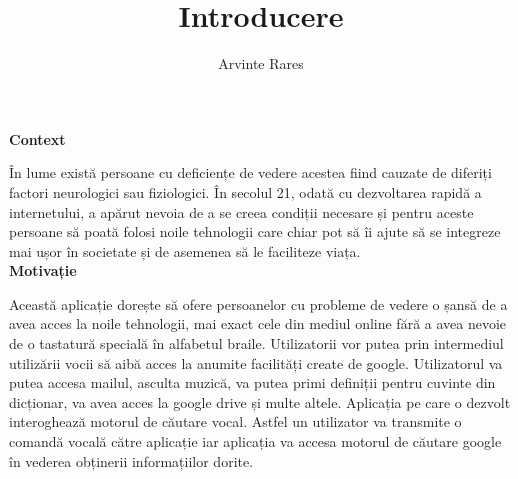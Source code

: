 \documentclass[a4paper]{article}
\title{Introducere}
\author{Arvinte Rares}
\date{}
\begin{document}
\maketitle


\large
\textbf{Context}\\
\normalsize

În lume există persoane cu deficiențe de vedere acestea fiind cauzate de diferiți factori neurologici sau fiziologici. În secolul 21, odată cu dezvoltarea rapidă a internetului, a apărut nevoia de a se creea condiții necesare și pentru aceste persoane să poată folosi noile tehnologii care chiar pot să îi ajute să se integreze mai ușor în societate și de asemenea să le faciliteze viața.\\

\large
\textbf{Motivație}\\
\normalsize

Această aplicație dorește să ofere persoanelor cu probleme de vedere o șansă de a avea acces la noile tehnologii, mai exact cele din mediul online fără a avea nevoie de o tastatură specială în alfabetul braile. Utilizatorii vor putea prin intermediul utilizării vocii să aibă acces la anumite facilități create de google. Utilizatorul va putea accesa mailul, asculta muzică, va putea primi definiții pentru cuvinte din dicționar, va avea acces la google drive și multe altele. Aplicația pe care o dezvolt interoghează motorul de căutare vocal. Astfel un utilizator va transmite o comandă vocală către aplicație iar aplicația va accesa motorul de căutare google în vederea obținerii informațiilor dorite.
\end{document}
